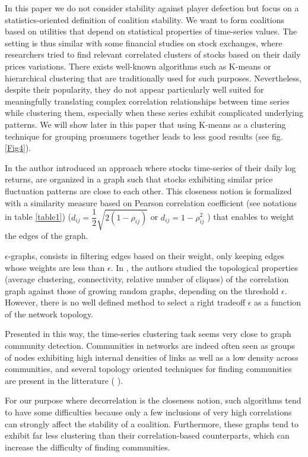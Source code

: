 \documentclass[conference]{IEEEtran}
\begin{document}
In this paper we do not consider stability against player defection but focus on a statistics-oriented definition of coalition stability. We want to form coalitions based on utilities that depend on statistical properties of time-series values. The setting is thus similar with some financial studies on stock exchanges, where researchers tried to find relevant correlated clusters of stocks based on their daily prices variations. There exists well-known algorithms such as K-means or hierarchical clustering that are traditionally used for such purposes. Nevertheless, despite their popularity, they do not appear particularly well suited for meaningfully translating complex correlation relationships between time series while clustering them, especially when these series exhibit complicated underlying patterns. We will show later in this paper that using K-means as a clustering technique for grouping prosumers together leads to less good results (see fig. \ref{Fig4}). 

In \cite{Mantegna1999} the author introduced an approach where stocks time-series of their daily log returns, are organized in a graph such that stocks exhibiting similar price fluctuation patterns are close to each other. This closeness notion is formalized with a similarity measure based on Pearson correlation coefficient (see notations in table \ref{table1}) ($ d_{ij} = \dfrac{1}{2}\sqrt{2(1-\rho_{ij})} $ or $ d_{ij} = 1 - \rho_{ij}^{2} $ ) that enables to weight the edges of the graph. 

$\epsilon$-graphs, consists in filtering edges based on their weight, only keeping edges whose weights are less than $ \epsilon $. In \cite{Garas2008, Onnela2004}, the authors studied the topological properties (average clustering, connectivity, relative number of cliques) of the correlation graph against those of growing random graphs, depending on the threshold $ \epsilon $. However, there is no well defined method to select a right tradeoff $ \epsilon $ as a function of the network topology.

Presented in this way, the time-series clustering task seems very close to graph community detection. Communities in networks are indeed often seen as groups of nodes exhibiting high internal densities of links as well as a low density across communities, and several topology oriented techniques for finding communities are present in the litterature (\cite{Newman2013} \cite{Girvan2002} \cite{Newman2013_2}). 

For our purpose where decorrelation is the closeness notion, such algorithms tend to have some difficulties because only a few inclusions of very high correlations can strongly affect the stability of a coalition. Furthermore, these graphs tend to exhibit far less clustering than their correlation-based counterparts, which can increase the difficulty of finding communities. 
\end{document}
